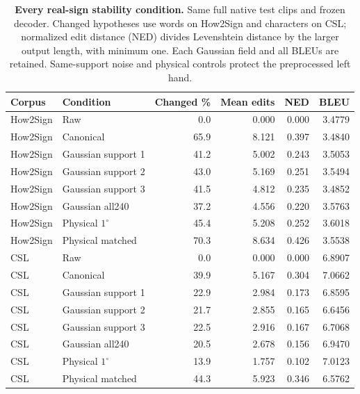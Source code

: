 \begin{table}[t]
\centering\small
\caption{\textbf{Every real-sign stability condition.} Same full native test clips and frozen decoder. Changed hypotheses use words on How2Sign and characters on CSL; normalized edit distance (NED) divides Levenshtein distance by the larger output length, with minimum one. Each Gaussian field and all BLEUs are retained. Same-support noise and physical controls protect the preprocessed left hand.}\label{tab:signstabilityall}
\begin{tabular}{@{}llrrrr@{}}\toprule
Corpus&Condition&Changed \%&Mean edits&NED&BLEU\\\midrule
How2Sign&Raw&0.0&0.000&0.000&3.4779\\
How2Sign&Canonical&65.9&8.121&0.397&3.4840\\
How2Sign&Gaussian support 1&41.2&5.002&0.243&3.5053\\
How2Sign&Gaussian support 2&43.0&5.169&0.251&3.5494\\
How2Sign&Gaussian support 3&41.5&4.812&0.235&3.4852\\
How2Sign&Gaussian all240&37.2&4.556&0.220&3.5763\\
How2Sign&Physical $1^\circ$&45.4&5.208&0.252&3.6018\\
How2Sign&Physical matched&70.3&8.634&0.426&3.5538\\
CSL&Raw&0.0&0.000&0.000&6.8907\\
CSL&Canonical&39.9&5.167&0.304&7.0662\\
CSL&Gaussian support 1&22.9&2.984&0.173&6.8595\\
CSL&Gaussian support 2&21.7&2.855&0.165&6.6456\\
CSL&Gaussian support 3&22.5&2.916&0.167&6.7068\\
CSL&Gaussian all240&20.5&2.678&0.156&6.9470\\
CSL&Physical $1^\circ$&13.9&1.757&0.102&7.0123\\
CSL&Physical matched&44.3&5.923&0.346&6.5762\\
\bottomrule\end{tabular}\end{table}
